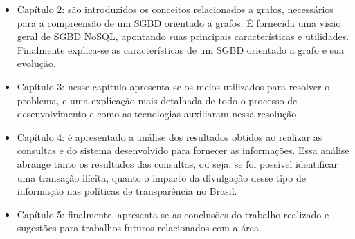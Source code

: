 	\begin{itemize}
		\item Capítulo 2: são introduzidos os conceitos relacionados a grafos, necessários para a compreensão de um SGBD orientado a grafos. É fornecida uma visão geral de SGBD NoSQL, apontando suas principais características e utilidades. Finalmente explica-se as características de um SGBD orientado a grafo e sua evolução.
		\item Capítulo 3: nesse capítulo apresenta-se os meios utilizados para resolver o problema, e uma explicação mais detalhada de todo o processo de desenvolvimento e como as tecnologias auxiliaram nessa resolução.
		\item Capítulo 4: é apresentado a análise dos resultados obtidos ao realizar as consultas e do sistema desenvolvido para fornecer as informações. Essa análise abrange tanto os resultados das consultas, ou seja, se foi possível identificar uma transação ilícita, quanto o impacto da divulgação desse tipo de informação nas políticas de transparência no Brasil.
		\item Capítulo 5: finalmente, apresenta-se as conclusões do trabalho realizado e sugestões para trabalhos futuros relacionados com a área.
	\end{itemize}